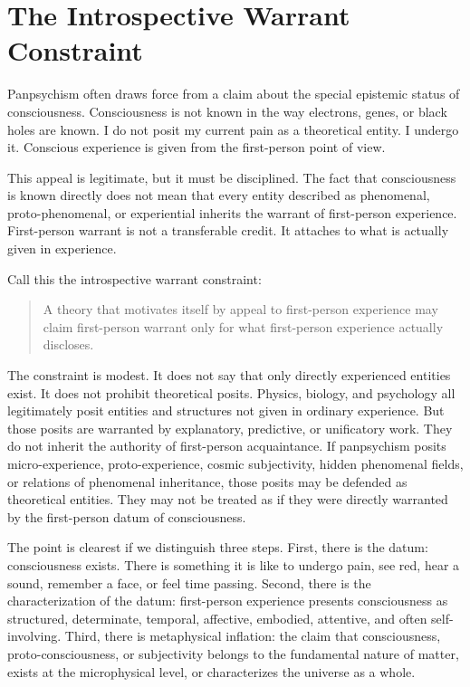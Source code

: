 \documentclass[12pt]{article}
\begin{document}
\section{The Introspective Warrant Constraint}

Panpsychism often draws force from a claim about the special epistemic status of consciousness. Consciousness is not known in the way electrons, genes, or black holes are known. I do not posit my current pain as a theoretical entity. I undergo it. Conscious experience is given from the first-person point of view.

This appeal is legitimate, but it must be disciplined. The fact that consciousness is known directly does not mean that every entity described as phenomenal, proto-phenomenal, or experiential inherits the warrant of first-person experience. First-person warrant is not a transferable credit. It attaches to what is actually given in experience.

Call this the introspective warrant constraint:

\begin{quote}
A theory that motivates itself by appeal to first-person experience may claim first-person warrant only for what first-person experience actually discloses.
\end{quote}

The constraint is modest. It does not say that only directly experienced entities exist. It does not prohibit theoretical posits. Physics, biology, and psychology all legitimately posit entities and structures not given in ordinary experience. But those posits are warranted by explanatory, predictive, or unificatory work. They do not inherit the authority of first-person acquaintance. If panpsychism posits micro-experience, proto-experience, cosmic subjectivity, hidden phenomenal fields, or relations of phenomenal inheritance, those posits may be defended as theoretical entities. They may not be treated as if they were directly warranted by the first-person datum of consciousness.

The point is clearest if we distinguish three steps. First, there is the datum: consciousness exists. There is something it is like to undergo pain, see red, hear a sound, remember a face, or feel time passing. Second, there is the characterization of the datum: first-person experience presents consciousness as structured, determinate, temporal, affective, embodied, attentive, and often self-involving. Third, there is metaphysical inflation: the claim that consciousness, proto-consciousness, or subjectivity belongs to the fundamental nature of matter, exists at the microphysical level, or characterizes the universe as a whole.
\end{document}
